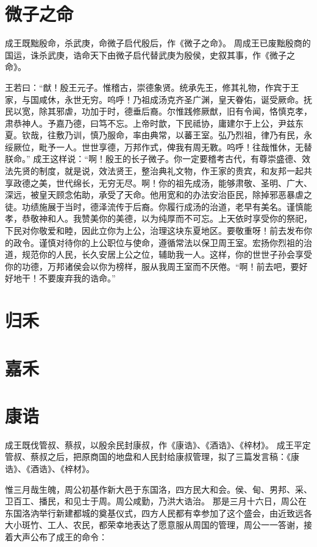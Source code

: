 \documentclass[a4paper,12pt,UTF8,twoside]{ctexbook}
\begin{document}
\chapter{微子之命}

成王既黜殷命，杀武庚，命微子启代殷后，作《微子之命》。
周成王已废黜殷商的国运，诛杀武庚，诰命天下由微子启代替武庚为殷侯，史叙其事，作《微子之命》。

王若曰：“猷！殷王元子。惟稽古，崇德象贤。统承先王，修其礼物，作宾于王家，与国咸休，永世无穷。呜呼！乃祖成汤克齐圣广渊，皇天眷佑，诞受厥命。抚民以宽，除其邪虐，功加于时，德垂后裔。尔惟践修厥猷，旧有令闻，恪慎克孝，肃恭神人。予嘉乃德，曰笃不忘。上帝时歆，下民祗协，庸建尔于上公，尹兹东夏。钦哉，往敷乃训，慎乃服命，率由典常，以蕃王室。弘乃烈祖，律乃有民，永绥厥位，毗予一人。世世享德，万邦作式，俾我有周无斁。呜呼！往哉惟休，无替朕命。”
成王这样说：“啊！殷王的长子微子。你一定要稽考古代，有尊崇盛德、效法先贤的制度，就是说，效法贤王，整治典礼文物，作王家的贵宾，和友邦一起共享政德之美，世代绵长，无穷无尽。啊！你的祖先成汤，能够肃敬、圣明、广大、深远，被皇天顾念佑助，承受了天命。他用宽和的办法安治臣民，除掉邪恶暴虐之徒。功绩施展于当时，德泽流传于后裔。你履行成汤的治道，老早有美名。谨慎能孝，恭敬神和人。我赞美你的美德，以为纯厚而不可忘。上天依时享受你的祭祀，下民对你敬爱和睦，因此立你为上公，治理这块东夏地区。要敬重呀！前去发布你的政令。谨慎对待你的上公职位与使命，遵循常法以保卫周王室。宏扬你烈祖的治道，规范你的人民，长久安居上公之位，辅助我一人。这样，你的世世子孙会享受你的功德，万邦诸侯会以你为榜样，服从我周王室而不厌倦。“啊！前去吧，要好好地干！不要废弃我的诰命。”

\chapter{归禾}

\chapter{嘉禾}

\chapter{康诰}

成王既伐管叔、蔡叔，以殷余民封康叔，作《康诰》、《酒诰》、《梓材》。
成王平定管叔、蔡叔之后，把原商国的地盘和人民封给康叔管理，拟了三篇发言稿：《康诰》、《酒诰》、《梓材》。

惟三月哉生魄，周公初基作新大邑于东国洛，四方民大和会。侯、甸、男邦、采、卫百工、播民，和见士于周。周公咸勤，乃洪大诰治。
那是三月十六日，周公在东国洛汭举行新建都城的奠基仪式，四方人民都有幸参加了这个盛会，由近致远各大小斑竹、工人、农民，都荣幸地表达了愿意服从周国的管理，周公一一答谢，接着大声公布了成王的命令：
\end{document}
